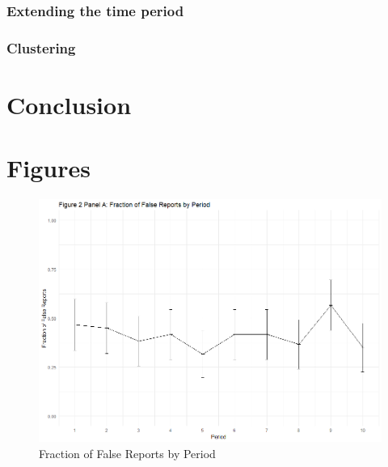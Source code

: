\documentclass[12pt,a4paper]{article}
\begin{document}
	\subsubsection{Extending the time period}
	
	
	\subsubsection{Clustering}
	
	
	\section{Conclusion}
	
	
	
	
	\newpage
	
	
	
	\newpage
	\section{Figures}
	
	\begin{figure}
		\centering
		\includegraphics[scale=0.4]{../../results/2a_rep.png}
		\caption{Fraction of False Reports by Period} \label{tab:R1}
		\label{fig:enter-label}
	\end{figure}
	
\end{document}
